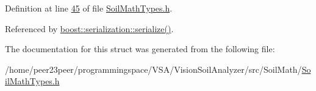 Definition at line \hyperlink{_soil_math_types_8h_source_l00045}{45} of file \hyperlink{_soil_math_types_8h_source}{Soil\+Math\+Types.\+h}.



Referenced by \hyperlink{predict__t__archive_8h_source_l00025}{boost\+::serialization\+::serialize()}.



The documentation for this struct was generated from the following file\+:\begin{DoxyCompactItemize}
\item 
/home/peer23peer/programmingspace/\+V\+S\+A/\+Vision\+Soil\+Analyzer/src/\+Soil\+Math/\hyperlink{_soil_math_types_8h}{Soil\+Math\+Types.\+h}\end{DoxyCompactItemize}
